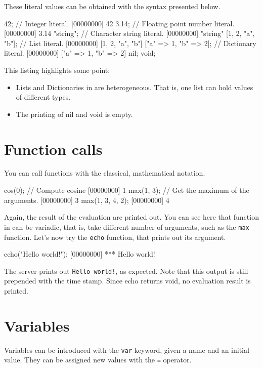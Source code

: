 These literal values can be obtained with the syntax presented below.

\begin{urbiscript}
42; // Integer literal.
[00000000] 42
3.14; // Floating point number literal.
[00000000] 3.14
"string"; // Character string literal.
[00000000] "string"
[1, 2, "a", "b"]; // List literal.
[00000000] [1, 2, "a", "b"]
["a" => 1, "b" => 2]; // Dictionary literal.
[00000000] ["a" => 1, "b" => 2]
nil;
void;
\end{urbiscript}

This listing highlights some point:
\begin{itemize}
\item Lists and Dictionaries in \us are heterogeneous. That is, one list can
  hold values of different types.
\item The printing of nil and void is empty.
\end{itemize}

\section{Function calls}

You can call functions with the classical, mathematical notation.

\begin{urbiscript}
cos(0); // Compute cosine
[00000000] 1
max(1, 3); // Get the maximum of the arguments.
[00000000] 3
max(1, 3, 4, 2);
[00000000] 4
\end{urbiscript}

Again, the result of the evaluation are printed out. You can see here
that function in \us can be variadic, that is, take different number
of arguments, such as the \lstinline{max} function. Let's now try the
\lstinline{echo} function, that prints out its argument.

\begin{urbiscript}
echo("Hello world!");
[00000000] *** Hello world!
\end{urbiscript}

The server prints out \lstinline{Hello world!}, as expected. Note that
this output is still prepended with the time stamp. Since echo returns
void, no evaluation result is printed.

\section{Variables}
Variables can be introduced with the \lstinline{var} keyword, given a
name and an initial value. They can be assigned new values with the
\lstinline{=} operator.

